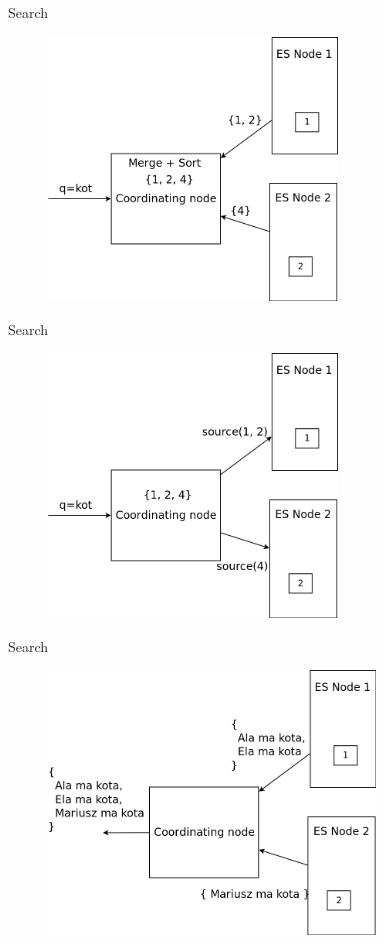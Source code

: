 \documentclass{beamer}
\begin{document}
\begin{frame}{Search}
	\begin{figure}
		\includegraphics[width=\textwidth,height=7cm,keepaspectratio=true]{search2}
	\end{figure}
\end{frame}
\begin{frame}{Search}
	\begin{figure}
		\includegraphics[width=\textwidth,height=7cm,keepaspectratio=true]{search3}
	\end{figure}
\end{frame}
\begin{frame}{Search}
	\begin{figure}
		\includegraphics[width=\textwidth,height=7cm,keepaspectratio=true]{search4}
	\end{figure}
\end{frame}
\end{document}

